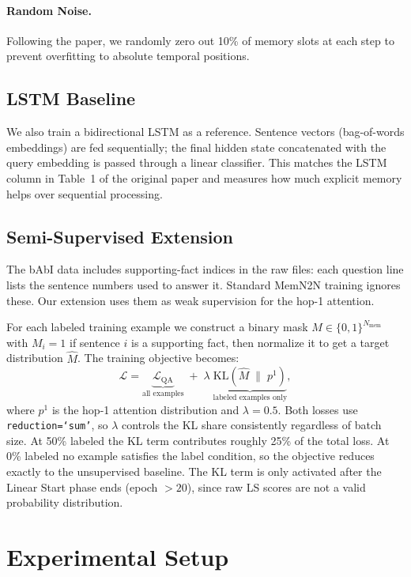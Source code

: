 \documentclass{article} %
\begin{document}
\paragraph{Random Noise.} Following the paper, we randomly zero out 10\% of memory slots at each step to prevent overfitting to absolute temporal positions.

\subsection{LSTM Baseline}

We also train a bidirectional LSTM \citep{hochreiter1997long} as a reference. Sentence vectors (bag-of-words embeddings) are fed sequentially; the final hidden state concatenated with the query embedding is passed through a linear classifier. This matches the LSTM column in Table~1 of the original paper and measures how much explicit memory helps over sequential processing.

\subsection{Semi-Supervised Extension}

The bAbI data includes supporting-fact indices in the raw files: each question line lists the sentence numbers used to answer it. Standard MemN2N training ignores these. Our extension uses them as weak supervision for the hop-1 attention.

For each labeled training example we construct a binary mask $M \in \{0,1\}^{N_{\text{mem}}}$ with $M_i = 1$ if sentence $i$ is a supporting fact, then normalize it to get a target distribution $\hat{M}$. The training objective becomes:
\[
\mathcal{L} = \underbrace{\mathcal{L}_{\mathrm{QA}}}_{\text{all examples}}
\;+\;
\lambda\; \underbrace{\mathrm{KL}\!\left(\hat{M}\;\|\;p^1\right)}_{\text{labeled examples only}},
\]
where $p^1$ is the hop-1 attention distribution and $\lambda = 0.5$. Both losses use \texttt{reduction=`sum'}, so $\lambda$ controls the KL share consistently regardless of batch size. At 50\% labeled the KL term contributes roughly 25\% of the total loss. At 0\% labeled no example satisfies the label condition, so the objective reduces exactly to the unsupervised baseline. The KL term is only activated after the Linear Start phase ends (epoch $> 20$), since raw LS scores are not a valid probability distribution.


\section{Experimental Setup}
\label{sec:setup}
\end{document}
